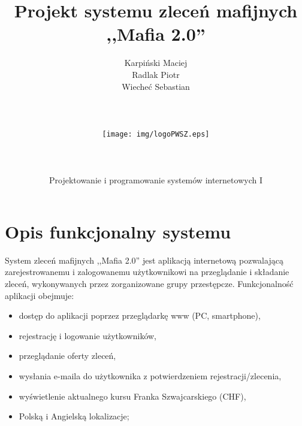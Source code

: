 \documentclass[12pt,a4paper]{article}
\author{Karpiński Maciej\\Radlak Piotr\\Wiecheć Sebastian\\\\\\\\\texttt{[image: img/logoPWSZ.eps]}\\\\\\\\Projektowanie i programowanie systemów internetowych I}
\title{Projekt systemu zleceń mafijnych\\,,Mafia 2.0''}
\begin{document}
	\maketitle
	\thispagestyle{empty}
	\clearpage

	\tableofcontents
	\newpage

	\section{Opis funkcjonalny systemu}
		\indent System zleceń mafijnych ,,Mafia 2.0'' jest aplikacją internetową pozwalającą zarejestrowanemu i zalogowanemu użytkownikowi na przeglądanie i składanie zleceń,
		wykonywanych przez zorganizowane grupy przestępcze. Funkcjonalność aplikacji obejmuje:
		\begin{itemize}
			\item dostęp do aplikacji poprzez przeglądarkę www (PC, smartphone),
			\item rejestrację i logowanie użytkowników,
			\item przeglądanie oferty zleceń,
			\item wysłania e-maila do użytkownika z potwierdzeniem rejestracji/zlecenia,
			\item wyświetlenie aktualnego kursu Franka Szwajcarskiego (CHF),
			\item Polską i Angielską lokalizacje;
		\end{itemize}
	\newpage

\end{document}
